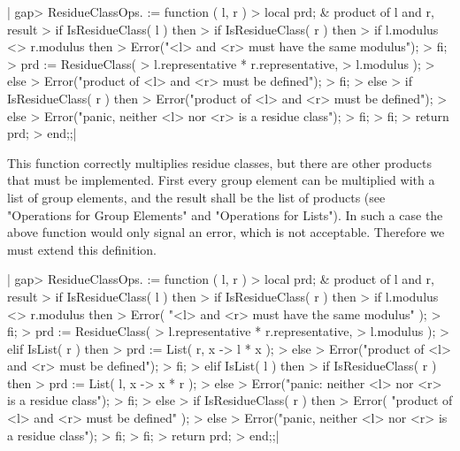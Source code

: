 |    gap> ResidueClassOps.\* := function ( l, r )
    >     local   prd;        & product of l and r, result
    >     if IsResidueClass( l )  then
    >         if IsResidueClass( r )  then
    >             if l.modulus <> r.modulus  then
    >                 Error("<l> and <r> must have the same modulus");
    >             fi;
    >             prd := ResidueClass(
    >                         l.representative * r.representative,
    >                         l.modulus );
    >         else
    >             Error("product of <l> and <r> must be defined");
    >         fi;
    >     else
    >         if IsResidueClass( r )  then
    >             Error("product of <l> and <r> must be defined");
    >         else
    >             Error("panic, neither <l> nor <r> is a residue class");
    >         fi;
    >     fi;
    >     return prd;
    > end;;|

This function correctly  multiplies residue classes,  but there are other
products that must be   implemented.  First every  group element   can be
multiplied with a  list of group elements,  and  the result shall  be the
list of products (see "Operations for Group Elements" and "Operations for
Lists").  In such  a case the above  function would only signal an error,
which is not acceptable.  Therefore we must extend this definition.

|    gap> ResidueClassOps.\* := function ( l, r )
    >     local   prd;        & product of l and r, result
    >     if IsResidueClass( l )  then
    >         if IsResidueClass( r )  then
    >             if l.modulus <> r.modulus  then
    >                 Error( "<l> and <r> must have the same modulus" );
    >             fi;
    >             prd := ResidueClass(
    >                         l.representative * r.representative,
    >                         l.modulus );
    >         elif IsList( r )  then
    >             prd := List( r, x -> l * x );
    >         else
    >             Error("product of <l> and <r> must be defined");
    >         fi;
    >     elif IsList( l )  then
    >         if IsResidueClass( r )  then
    >             prd := List( l, x -> x * r );
    >         else
    >             Error("panic: neither <l> nor <r> is a residue class");
    >         fi;
    >     else
    >         if IsResidueClass( r )  then
    >             Error( "product of <l> and <r> must be defined" );
    >         else
    >             Error("panic, neither <l> nor <r> is a residue class");
    >         fi;
    >     fi;
    >     return prd;
    > end;;|

